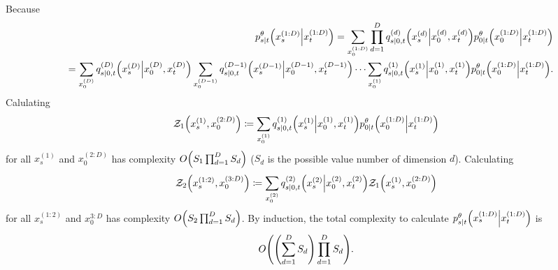 \documentclass[10pt]{article}
\begin{document}
Because
\begin{eqnarray*}
  &&p^\theta_{s|t}\qty(x_s^{(1:D)}\middle|x_t^{(1:D)}) = \sum_{x_0^{(1:D)}}\prod_{d=1}^D q_{s|0,t}^{(d)}\qty(x_s^{(d)}\middle|x_0^{(d)}, x_t^{(d)})p^\theta_{0|t}\qty(x_0^{(1:D)}\middle|x_t^{(1:D)})\\
  &&=\sum_{x_0^{(D)}}q_{s|0,t}^{(D)}\qty(x_s^{(D)}\middle|x_0^{(D)}, x_t^{(D)})\sum_{x_0^{(D-1)}}q_{s|0,t}^{(D-1)}\qty(x_s^{(D-1)}\middle|x_0^{(D-1)}, x_t^{(D-1)})\cdots\sum_{x_0^{(1)}}q_{s|0,t}^{(1)}\qty(x_s^{(1)}\middle|x_0^{(1)}, x_t^{(1)})p^\theta_{0|t}\qty(x_0^{(1:D)}\middle|x_t^{(1:D)}).
\end{eqnarray*}
Calulating
\begin{eqnarray*}
  \mathcal{Z}_1\qty(x_s^{(1)},x_0^{(2:D)})\coloneq\sum_{x_0^{(1)}}q_{s|0,t}^{(1)}\qty(x_s^{(1)}\middle|x_0^{(1)}, x_t^{(1)})p^\theta_{0|t}\qty(x_0^{(1:D)}\middle|x_t^{(1:D)})
\end{eqnarray*}
for all $x_s^{(1)}$ and $x_0^{(2:D)}$ has complexity $O\qty(S_1\prod_{d=1}^D S_d)$ ($S_d$ is the possible value number of dimension $d$). Calculating
\begin{eqnarray*}
  \mathcal{Z}_2\qty(x_s^{(1:2)},x_0^{(3:D)})\coloneq\sum_{x_0^{(2)}}q_{s|0,t}^{(2)}\qty(x_s^{(2)}\middle|x_0^{(2)}, x_t^{(2)})\mathcal{Z}_1\qty(x_s^{(1)},x_0^{(2:D)})
\end{eqnarray*}
for all $x_s^{(1:2)}$ and $x_0^{3:D}$ has complexity $O\qty(S_2\prod_{d=1}^D S_d)$. By induction, the total complexity to calculate $p^\theta_{s|t}\qty(x_s^{(1:D)}\middle|x_t^{(1:D)})$ is
\begin{eqnarray*}
  O\qty(\qty(\sum_{d=1}^D S_d)\prod_{d=1}^D S_d).
\end{eqnarray*}
\end{document}
